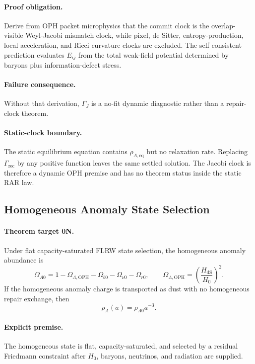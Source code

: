 \documentclass[11pt]{article}
\newcommand{\OPH}{\mathrm{OPH}}
\begin{document}
\paragraph{Proof obligation.}
Derive from OPH packet microphysics that the commit clock is the
overlap-visible Weyl-Jacobi mismatch clock, while pixel, de Sitter,
entropy-production, local-acceleration, and Ricci-curvature clocks are
excluded.  The
self-consistent prediction evaluates \(E_{ij}\) from the total weak-field
potential determined by baryons plus information-defect stress.

\paragraph{Failure consequence.}
Without that derivation, \(\Gamma_J\) is a no-fit dynamic diagnostic rather
than a repair-clock theorem.

\paragraph{Static-clock boundary.}
The static equilibrium equation contains \(\rho_{A,\mathrm{eq}}\) but no
relaxation rate.  Replacing \(\Gamma_{\mathrm{rec}}\) by any positive function
leaves the same settled solution.  The Jacobi clock is therefore a dynamic
OPH premise and has no theorem status inside the static RAR law.

\subsection{Homogeneous Anomaly State Selection}

\paragraph{Theorem target 0N.}
Under flat capacity-saturated FLRW state selection, the homogeneous anomaly
abundance is
\begin{equation}
  \Omega_{A0}
  =
  1-\Omega_{\Lambda,\OPH}
   -\Omega_{b0}-\Omega_{\nu0}-\Omega_{r0},
  \qquad
  \Omega_{\Lambda,\OPH}
  =
  \left(\frac{H_{\mathrm{dS}}}{H_0}\right)^2.
\end{equation}
If the homogeneous anomaly charge is transported as dust with no homogeneous
repair exchange, then
\begin{equation}
  \rho_A(a)=\rho_{A0}a^{-3}.
\end{equation}

\paragraph{Explicit premise.}
The homogeneous state is flat, capacity-saturated, and selected by a residual
Friedmann constraint after \(H_0\), baryons, neutrinos, and radiation are
supplied.
\end{document}
